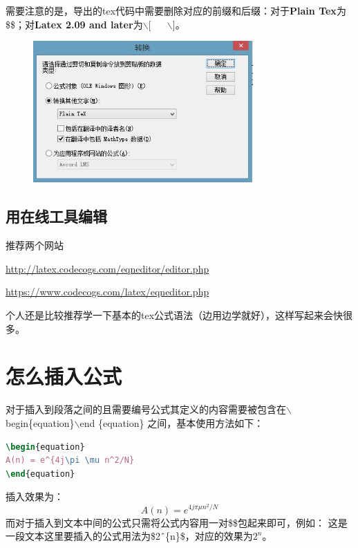 需要注意的是，导出的tex代码中需要删除对应的前缀和后缀：对于\textbf{Plain Tex}为\$\$；对\textbf{Latex 2.09 and later}为$\backslash$[ $\quad$ $\backslash$]。

\begin{figure}[h]
\centering
 \includegraphics[width=0.75\textwidth]{HelperSection/figures/copy_type.jpg}
\end{figure}
\subsection{用在线工具编辑}
推荐两个网站

\url{http://latex.codecogs.com/eqneditor/editor.php}

\url{https://www.codecogs.com/latex/eqneditor.php}

个人还是比较推荐学一下基本的tex公式语法（边用边学就好），这样写起来会快很多。

\section{怎么插入公式}
对于插入到段落之间的且需要编号公式其定义的内容需要被包含在$\backslash$begin\{equation\}$\backslash$end \{equation\} 之间，基本使用方法如下：
\begin{lstlisting}[language={tex}, caption={插入公式基本操作}]
\begin{equation}
A(n) = e^{4j\pi \mu n^2/N}
\end{equation}
\end{lstlisting}
插入效果为：
\begin{equation}
A(n) = e^{4j\pi \mu n^2/N}
\end{equation}
而对于插入到文本中间的公式只需将公式内容用一对\$\$包起来即可，例如：
这是一段文本这里要插入的公式用法为\$2\^\ \{n\}\$，对应的效果为$2^{n}$。
